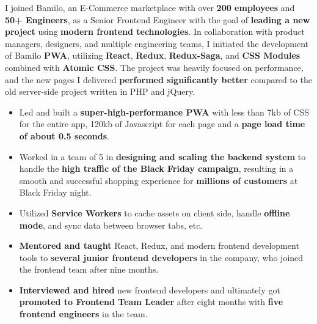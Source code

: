 \bigskip
\divider
\bigskip

I joined Bamilo, an E-Commerce marketplace with over \textbf{200 employees} and \textbf{50+ Engineers}, as a Senior Frontend Engineer with the goal of \textbf{leading a new project} using \textbf{modern frontend technologies}. In collaboration with product managers, designers, and multiple engineering teams, I initiated the development of Bamilo \textbf{PWA}, utilizing \textbf{React}, \textbf{Redux}, \textbf{Redux-Saga}, and \textbf{CSS Modules} combined with \textbf{Atomic CSS}. The project was heavily focused on performance, and the new pages I delivered \textbf{performed significantly better} compared to the old server-side project written in PHP and jQuery.
\medskip
\begin{itemize}
    \item Led and built a \textbf{super-high-performance PWA} with less than 7kb of CSS for the entire app, 120kb of Javascript for each page and a \textbf{page load time of about 0.5 seconds}.
    \item Worked in a team of 5 in \textbf{designing and scaling the backend system} to handle the \textbf{high traffic of the Black Friday campaign}, resulting in a smooth and successful shopping experience for \textbf{millions of customers} at Black Friday night.
    \item Utilized \textbf{Service Workers} to cache assets on client side, handle \textbf{offline mode}, and sync data between browser tabs, etc.
    \item \textbf{Mentored and taught} React, Redux, and modern frontend development tools to \textbf{several junior frontend developers} in the company, who joined the frontend team after nine months.
    \item \textbf{Interviewed and hired} new frontend developers and ultimately got \textbf{promoted to Frontend Team Leader} after eight months with \textbf{five frontend engineers} in the team.
\end{itemize}

